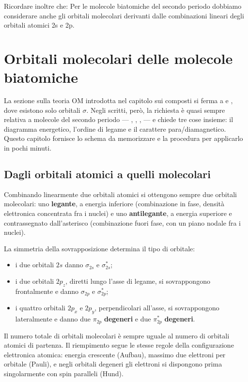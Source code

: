 \documentclass[11pt, a4paper, openright]{book}
\begin{document}
Ricordare inoltre che: Per le molecole biatomiche del secondo periodo dobbiamo considerare anche gli orbitali molecolari derivanti dalle combinazioni lineari degli orbitali atomici 2s e 2p.

\newpage


\section{Orbitali molecolari delle molecole biatomiche}

La sezione sulla teoria OM introdotta nel capitolo sui composti si ferma a  e
, dove esistono solo orbitali $\sigma$. Negli scritti, però, la richiesta è quasi
sempre relativa a molecole del secondo periodo --- , , ,  ---
e chiede tre cose insieme: il diagramma energetico, l'ordine di legame e il carattere
para\-/diamagnetico. Questo capitolo fornisce lo schema da memorizzare e la procedura per
applicarlo in pochi minuti.

\subsection{Dagli orbitali atomici a quelli molecolari}

Combinando linearmente due orbitali atomici si ottengono sempre due orbitali molecolari:
uno \textbf{legante}, a energia inferiore (combinazione in fase, densità elettronica
concentrata fra i nuclei) e uno \textbf{antilegante}, a energia superiore e contrassegnato
dall'asterisco (combinazione fuori fase, con un piano nodale fra i nuclei).

La simmetria della sovrapposizione determina il tipo di orbitale:

\begin{itemize}
  \item i due orbitali $2s$ danno $\sigma_{2s}$ e $\sigma^*_{2s}$;
  \item i due orbitali $2p_z$, diretti lungo l'asse di legame, si sovrappongono frontalmente
        e danno $\sigma_{2p}$ e $\sigma^*_{2p}$;
  \item i quattro orbitali $2p_x$ e $2p_y$, perpendicolari all'asse, si sovrappongono
        lateralmente e danno due $\pi_{2p}$ \textbf{degeneri} e due $\pi^*_{2p}$
        \textbf{degeneri}.
\end{itemize}

Il numero totale di orbitali molecolari è sempre uguale al numero di orbitali atomici di
partenza. Il riempimento segue le stesse regole della configurazione elettronica atomica:
energia crescente (Aufbau), massimo due elettroni per orbitale (Pauli), e negli orbitali
degeneri gli elettroni si dispongono prima singolarmente con spin paralleli (Hund).
\end{document}

